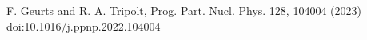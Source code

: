 
F. Geurts and R. A. Tripolt, Prog. Part. Nucl. Phys. 128, 104004 (2023) doi:10.1016/j.ppnp.2022.104004